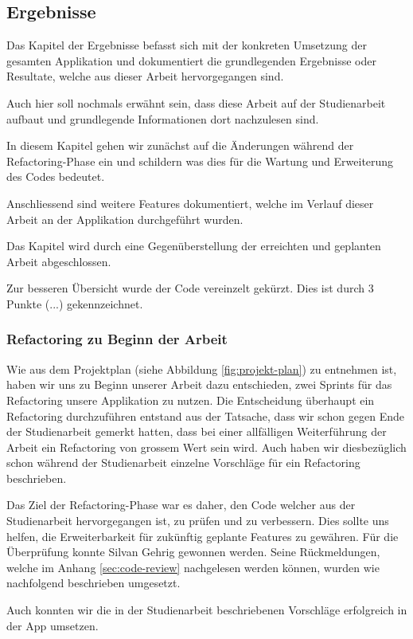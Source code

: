 \subsection{Ergebnisse}
Das Kapitel der Ergebnisse befasst sich mit der konkreten Umsetzung der gesamten Applikation und dokumentiert die grundlegenden Ergebnisse oder Resultate, welche aus dieser Arbeit hervorgegangen sind. 

Auch hier soll nochmals erwähnt sein, dass diese Arbeit auf der Studienarbeit \cite{methode635-sa} aufbaut und grundlegende Informationen dort nachzulesen sind. 

In diesem Kapitel gehen wir zunächst auf die Änderungen während der Refactoring-Phase ein und schildern was dies für die Wartung und Erweiterung des Codes bedeutet. 

Anschliessend sind weitere Features dokumentiert, welche im Verlauf dieser Arbeit an der Applikation durchgeführt wurden.

Das Kapitel wird durch eine Gegenüberstellung der erreichten und geplanten Arbeit abgeschlossen.

Zur besseren Übersicht wurde der Code vereinzelt gekürzt. Dies ist durch 3 Punkte (...) gekennzeichnet.

\subsubsection{Refactoring zu Beginn der Arbeit}
Wie aus dem Projektplan (siehe Abbildung \ref{fig:projekt-plan}) zu entnehmen ist, haben wir uns zu Beginn unserer Arbeit dazu entschieden, zwei Sprints für das Refactoring unsere Applikation zu nutzen. Die Entscheidung überhaupt ein Refactoring durchzuführen entstand aus der Tatsache, dass wir schon gegen Ende der Studienarbeit gemerkt hatten, dass bei einer allfälligen Weiterführung der Arbeit ein Refactoring von grossem Wert sein wird. Auch haben wir diesbezüglich schon während der Studienarbeit einzelne Vorschläge für ein Refactoring beschrieben.


Das Ziel der Refactoring-Phase war es daher, den Code welcher aus der Studienarbeit hervorgegangen ist, zu prüfen und zu verbessern. Dies sollte uns helfen, die Erweiterbarkeit für zukünftig geplante Features zu gewähren. Für die Überprüfung konnte Silvan Gehrig gewonnen werden. Seine Rückmeldungen, welche im Anhang \ref{sec:code-review} nachgelesen werden können, wurden wie nachfolgend beschrieben umgesetzt.

Auch konnten wir die in der Studienarbeit beschriebenen Vorschläge erfolgreich in der App umsetzen.
 
